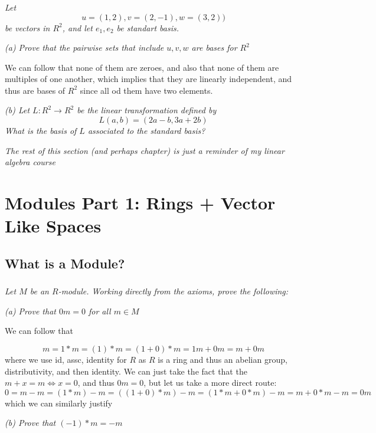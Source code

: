 \documentclass[11pt,oneside,titlepage]{book}
\DeclareMathOperator \lra {\Leftrightarrow}
\begin{document}
\subsection{}

\textit{Let
  $$u = (1, 2), v = (2, -1), w = (3, 2))$$
  be vectors in $R^2$, and let $e_1, e_2$ be standart basis.}

\textit{(a) Prove that the pairwise sets that include $u, v, w$ are
  bases for $R^2$}

We can follow that none of them are zeroes, and also that none of them
are multiples of one another, which implies that they are linearly
independent, and thus are bases of $R^2$ since all od them have two elements.

\textit{(b) Let $L: R^2 \to R^2$ be the linear transformation defined
  by
  $$L(a, b) = (2a - b, 3a + 2b)$$
  What is the basis of $L$ associated to the standard basis?}

\textit{The rest of this section (and perhaps chapter) is just a
  reminder of my linear algebra course}

\chapter{Modules Part 1: Rings + Vector Like Spaces}

\section{What is a Module?}

\subsection{}

\textit{Let $M$ be an $R$-module. Working directly from the axioms, prove the following:}

\textit{(a) Prove that $0m = 0$ for all $m \in M$}

We can follow that

$$m = 1 * m = (1) * m = (1 + 0) * m = 1m + 0m = m + 0m$$
where we use id, assc, identity for $R$ as $R$ is a ring and thus an
abelian group, distributivity, and then identity. We can just take the
fact that the $m + x = m \lra x = 0$, and thus $0m = 0$, but let us
take a more direct route:
$$0 = m - m = (1 * m) - m = ((1 + 0) * m) - m =
(1 * m + 0 * m) - m = m + 0 * m - m = 0m$$
which we can similarly justify

\textit{(b) Prove that $(-1) * m = -m$}
\end{document}
